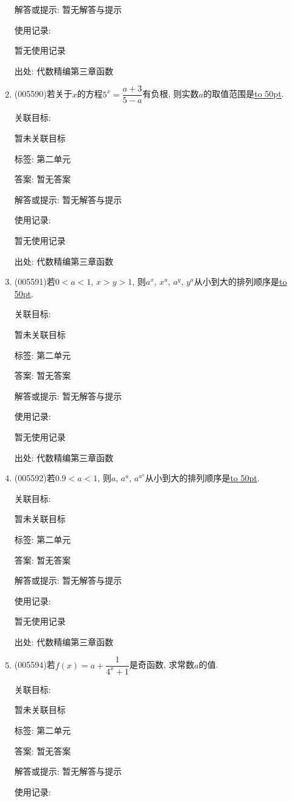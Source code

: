 \documentclass[10pt,a4paper]{article}
\newcommand{\blank}[1]{\underline{\hbox to #1pt{}}}
\begin{document}
\begin{enumerate}[1.]
解答或提示: 暂无解答与提示

使用记录:

暂无使用记录


出处: 代数精编第三章函数
\item { (005590)}若关于$x$的方程$5^x=\dfrac{a+3}{5-a}$有负根, 则实数$a$的取值范围是\blank{50}.


关联目标:

暂未关联目标



标签: 第二单元

答案: 暂无答案

解答或提示: 暂无解答与提示

使用记录:

暂无使用记录


出处: 代数精编第三章函数
\item { (005591)}若$0<a<1$, $x>y>1$, 则$a^x$, $x^a$, $a^y$, $y^a$从小到大的排列顺序是\blank{50}.


关联目标:

暂未关联目标



标签: 第二单元

答案: 暂无答案

解答或提示: 暂无解答与提示

使用记录:

暂无使用记录


出处: 代数精编第三章函数
\item { (005592)}若$0.9<a<1$, 则$a$, $a^a$, $a^{a^a}$从小到大的排列顺序是\blank{50}.


关联目标:

暂未关联目标



标签: 第二单元

答案: 暂无答案

解答或提示: 暂无解答与提示

使用记录:

暂无使用记录


出处: 代数精编第三章函数
\item { (005594)}若$f(x)=a+\dfrac 1{4^x+1}$是奇函数, 求常数$a$的值.


关联目标:

暂未关联目标



标签: 第二单元

答案: 暂无答案

解答或提示: 暂无解答与提示

使用记录:


\end{enumerate}
\end{document}
